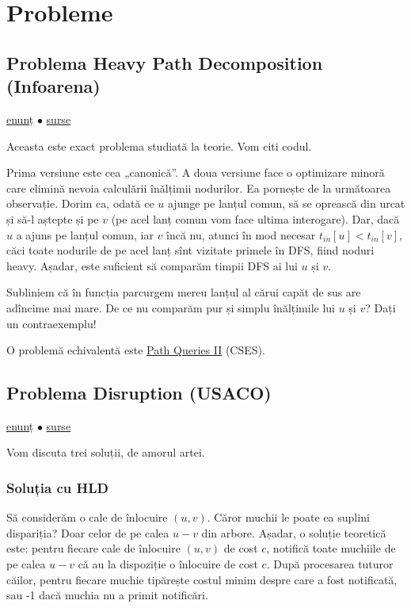 \documentclass[../main.tex]{subfiles}
\begin{document}
\section{Probleme}

\subsection{Problema Heavy Path Decomposition (Infoarena)}
\label{problem:heavy-path-decomposition}

\href{https://www.infoarena.ro/problema/heavypath}{enunț}
$\bullet$
\hyperref[code:heavy-path-decomposition]{surse}

Aceasta este exact problema studiată la teorie. Vom citi codul.

Prima versiune este cea „canonică”. A doua versiune face o optimizare minoră care elimină nevoia calculării înălțimii nodurilor. Ea pornește de la următoarea observație. Dorim ca, odată ce $u$ ajunge pe lanțul comun, să se oprească din urcat și să-l aștepte și pe $v$ (pe acel lanț comun vom face ultima interogare). Dar, dacă $u$ a ajuns pe lanțul comun, iar $v$ încă nu, atunci în mod necesar $t_{in}[u] < t_{in}[v]$, căci toate nodurile de pe acel lanț sînt vizitate primele în DFS, fiind noduri heavy. Așadar, este suficient să comparăm timpii DFS ai lui $u$ și $v$.

Subliniem că în funcția  parcurgem mereu lanțul al cărui capăt de sus are adîncime mai mare. De ce nu comparăm pur și simplu înălțimile lui $u$ și $v$? Dați un contraexemplu!

O problemă echivalentă este \href{https://cses.fi/problemset/task/2134}{Path Queries II} (CSES).

\subsection{Problema Disruption (USACO)}
\label{problem:disruption}

\href{https://usaco.org/index.php?page=viewproblem2\&cpid=842}{enunț}
$\bullet$
\hyperref[code:disruption]{surse}

Vom discuta trei soluții, de amorul artei.

\subsubsection*{Soluția cu HLD}

Să considerăm o cale de înlocuire $(u,v)$. Căror muchii le poate ea suplini dispariția? Doar celor de pe calea $u-v$ din arbore. Așadar, o soluție teoretică este: pentru fiecare cale de înlocuire $(u,v)$ de cost $c$, notifică toate muchiile de pe calea $u-v$ că au la dispoziție o înlocuire de cost $c$. După procesarea tuturor căilor, pentru fiecare muchie tipărește costul minim despre care a fost notificată, sau -1 dacă muchia nu a primit notificări.
\end{document}
